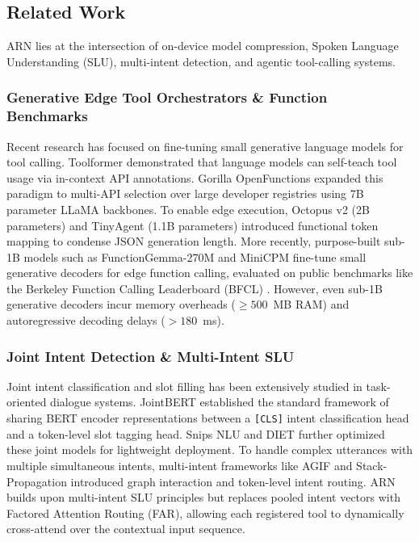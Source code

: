 \documentclass[letterpaper]{article} %
\begin{document}
\subsection{Related Work}

ARN lies at the intersection of on-device model compression, Spoken Language Understanding (SLU), multi-intent detection, and agentic tool-calling systems.

\subsubsection{Generative Edge Tool Orchestrators \& Function Benchmarks}
Recent research has focused on fine-tuning small generative language models for tool calling. Toolformer \citep{schick2023toolformer} demonstrated that language models can self-teach tool usage via in-context API annotations. Gorilla OpenFunctions \citep{patil2023gorilla} expanded this paradigm to multi-API selection over large developer registries using 7B parameter LLaMA backbones. To enable edge execution, Octopus v2 \citep{chen2024octopus} (2B parameters) and TinyAgent \citep{erdogan2024tinyagent} (1.1B parameters) introduced functional token mapping to condense JSON generation length. More recently, purpose-built sub-1B models such as FunctionGemma-270M \citep{google2025functiongemma} and MiniCPM \citep{openbmb2024minicpm} fine-tune small generative decoders for edge function calling, evaluated on public benchmarks like the Berkeley Function Calling Leaderboard (BFCL) \citep{patil2025berkeley}. However, even sub-1B generative decoders incur memory overheads ($\ge 500$~MB RAM) and autoregressive decoding delays ($>180$~ms).

\subsubsection{Joint Intent Detection \& Multi-Intent SLU}
Joint intent classification and slot filling has been extensively studied in task-oriented dialogue systems. JointBERT \citep{chen2019bert} established the standard framework of sharing BERT encoder representations between a \texttt{[CLS]} intent classification head and a token-level slot tagging head. Snips NLU \citep{coucke2018snips} and DIET \citep{bunk2020diet} further optimized these joint models for lightweight deployment. To handle complex utterances with multiple simultaneous intents, multi-intent frameworks like AGIF \citep{xie2020agif} and Stack-Propagation \citep{qin2019stack} introduced graph interaction and token-level intent routing. ARN builds upon multi-intent SLU principles but replaces pooled intent vectors with Factored Attention Routing (FAR), allowing each registered tool to dynamically cross-attend over the contextual input sequence.
\end{document}
